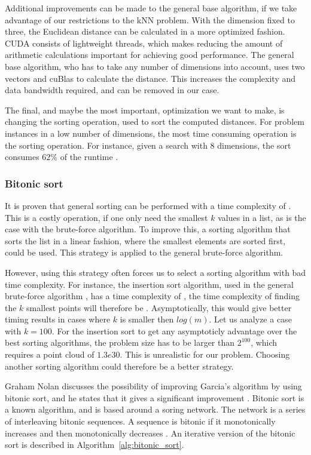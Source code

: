Additional improvements can be made to the general base algorithm, if we take advantage of our restrictions to the kNN problem. With the dimension fixed to three, the Euclidean distance can be calculated in a more optimized fashion. CUDA consists of lightweight threads, which makes reducing the amount of arithmetic calculations important for achieving good performance. The general base algorithm, who has to take any number of dimensions into account, uses two vectors and cuBlas to calculate the distance. This increases the complexity and data bandwidth required, and can be removed in our case.

The final, and maybe the most important, optimization we want to make, is changing the sorting operation, used to sort the computed distances. For problem instances in a low number of dimensions, the most time consuming operation is the sorting operation. For instance, given a search with $8$ dimensions, the sort consumes $62\%$ of the runtime \cite{Garcia2008}.

\subsubsection{Bitonic sort} %
\label{ssub:bitonic_sort}

It is proven that general sorting can be performed with a time complexity of  \cite{Cormen:2001}. This is a costly operation, if one only need the smallest $k$ values in a list, as is the case with the brute-force algorithm. To improve this, a sorting algorithm that sorts the list in a linear fashion, where the smallest elements are sorted first, could be used. This strategy is applied to the general brute-force algorithm.

However, using this strategy often forces us to select a sorting algorithm with bad time complexity. For instance, the insertion sort algorithm, used in the general brute-force algorithm \cite{Cormen:2001}, has a time complexity of , the time complexity of finding the $k$ smallest points will therefore be . Asymptotically, this would give better timing results in cases where $k$ is smaller then $log(m)$. Let us analyze a case with $k=100$. For the insertion sort to get any asymptoticly advantage over the best sorting algorithms, the problem size has to be larger than $2^{100}$, which requires a point cloud of $1.3e30$. This is unrealistic for our problem. Choosing another sorting algorithm could therefore be a better strategy.

Graham Nolan discusses the possibility of improving Garcia's algorithm by using bitonic sort, and he states that it gives a significant improvement \citep{Nolan}. Bitonic sort is a known  algorithm, and is based around a soring network. The network is a series of interleaving bitonic sequences. A sequence is bitonic if it monotonically increases and then monotonically decreases \cite{Cormen:2001}. An iterative version of the bitonic sort is described in Algorithm~\ref{alg:bitonic_sort}.

